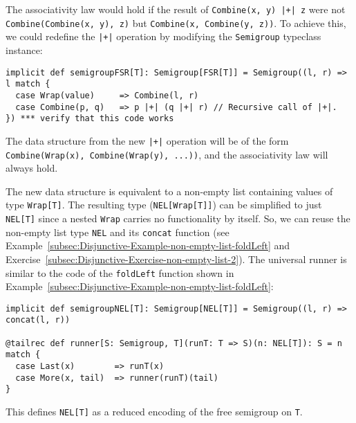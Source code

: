 The associativity law would hold if the result of \lstinline!Combine(x, y) |+| z!
were not \lstinline!Combine(Combine(x, y), z)!
but \lstinline!Combine(x, Combine(y, z))!.
To achieve this, we could redefine the \lstinline!|+|!
operation by modifying the \lstinline!Semigroup!
typeclass instance:
\begin{lstlisting}
implicit def semigroupFSR[T]: Semigroup[FSR[T]] = Semigroup((l, r) => l match {
  case Wrap(value)     => Combine(l, r)
  case Combine(p, q)   => p |+| (q |+| r) // Recursive call of |+|.
}) *** verify that this code works
\end{lstlisting}
The data structure from the new \lstinline!|+|!
operation will be of the form \lstinline!Combine(Wrap(x), Combine(Wrap(y), ...))!,
and the associativity law will always hold. 

The new data structure is equivalent to a non-empty list containing
values of type \lstinline!Wrap[T]!.
The resulting type (\lstinline!NEL[Wrap[T]]!)
can be simplified to just \lstinline!NEL[T]!
since a nested \lstinline!Wrap!
carries no functionality by itself. So, we can reuse the non-empty
list type \lstinline!NEL!
and its \lstinline!concat!
function (see Example~\ref{subsec:Disjunctive-Example-non-empty-list-foldLeft}
and Exercise~\ref{subsec:Disjunctive-Exercise-non-empty-list-2}).
The universal runner is similar to the code of the \lstinline!foldLeft!
function shown in Example~\ref{subsec:Disjunctive-Example-non-empty-list-foldLeft}:
\begin{lstlisting}
implicit def semigroupNEL[T]: Semigroup[NEL[T]] = Semigroup((l, r) => concat(l, r))
 
@tailrec def runner[S: Semigroup, T](runT: T => S)(n: NEL[T]): S = n match {
  case Last(x)        => runT(x)
  case More(x, tail)  => runner(runT)(tail)
}
\end{lstlisting}
This defines \lstinline!NEL[T]!
as a reduced encoding of the free semigroup on \lstinline!T!. 

